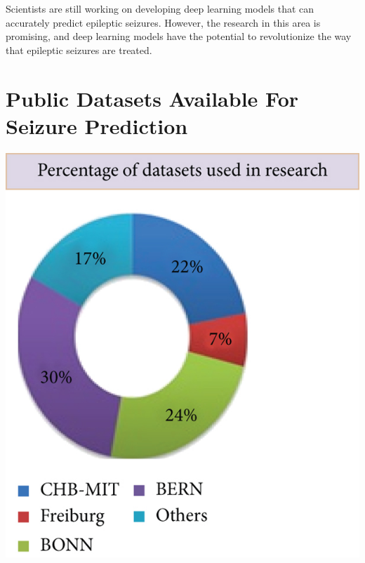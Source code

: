 \documentclass[stu,donotrepeattitle]{apa7}
\begin{document}
    Scientists are still working on developing deep learning models that can accurately predict epileptic seizures. However, the research in this area is promising, and deep learning models have the potential to revolutionize the way that epileptic seizures are treated.    


\section{Public Datasets Available For Seizure Prediction}

\includegraphics{img/4.jpg}

\printbibliography{}
\end{document}
